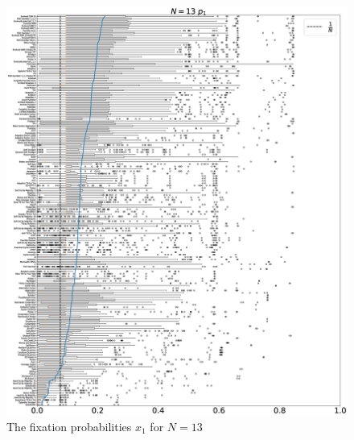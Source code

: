 \documentclass[10pt,letterpaper]{article}
\begin{document}
\begin{figure}[!hbtp]
    \centering
    \includegraphics[draft, width=\textwidth]{./Fig23.eps}
    \caption{The fixation probabilities \(x_1\) for \(N=13\)}
\end{figure}
\end{document}
